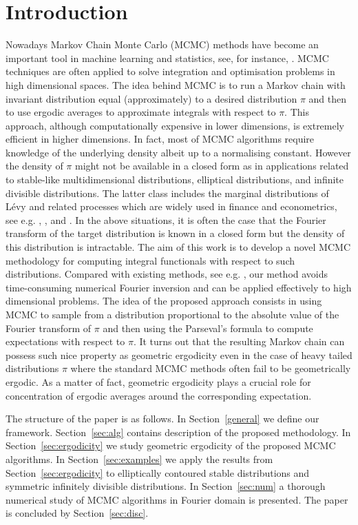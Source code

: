 \documentclass[preprint, 3p, authoryear]{elsarticle}
\theoremstyle{definition}
\begin{document}
\section*{Introduction}

Nowadays Markov Chain Monte Carlo (MCMC) methods have become an important tool in machine learning and statistics, see, for instance, \cite{MR2933059, MR2238833,MR2260716}.  MCMC techniques are often applied to solve integration and optimisation problems in high dimensional spaces. The idea behind MCMC is to run a Markov chain with invariant distribution equal (approximately) to a desired distribution \(\pi\)  and then to use ergodic averages to approximate integrals with respect to \(\pi\). This approach, although computationally expensive in lower dimensions, is extremely efficient in higher dimensions. In fact, most of MCMC algorithms require  knowledge of the underlying density albeit up to a normalising  constant. However  the density of \(\pi\) might not be  available in a closed form as in applications related to stable-like multidimensional distributions,  elliptical distributions, and infinite divisible distributions. The latter class includes the  marginal distributions of L\'evy and related processes which are widely used in finance and econometrics, see e.g. \cite{tankov2003financial}, \cite{nolan2013}, and \cite{BCGMR}. 
In the above situations, it is often the case that the
Fourier transform of the target distribution is known in a closed form but the density of this distribution is intractable.  
The aim of this work is to develop a novel  MCMC methodology 
for computing integral functionals with respect to such distributions. 
Compared with existing methods, see e.g.  \cite{MR2752708},
our method avoids time-consuming numerical Fourier inversion and can be applied
effectively to high dimensional problems.  The idea of the proposed approach consists in using MCMC to sample from a distribution proportional to the absolute value of the  Fourier transform of \(\pi\) and then using the Parseval's formula to compute expectations with respect to \(\pi\). It turns out that  the resulting Markov chain can possess such nice property  as geometric ergodicity even in the case of heavy tailed  distributions \(\pi\) where the standard MCMC methods often fail to be geometrically ergodic. As a matter of fact, geometric ergodicity  plays a crucial role for concentration of ergodic averages around the corresponding expectation. 
\par
The structure of the paper is as follows. In Section~\ref{general} 
we define our framework. Section~\ref{sec:alg} contains description of the proposed methodology. In Section~\ref{sec:ergodicity} we study geometric ergodicity of the proposed MCMC algorithms. In Section~\ref{sec:examples} we apply the results from Section~\ref{sec:ergodicity} to elliptically contoured stable distributions and symmetric infinitely divisible distributions. In Section~\ref{sec:num} a thorough numerical study of MCMC algorithms in Fourier domain is presented. The paper is concluded by Section~\ref{sec:disc}.
\end{document}
